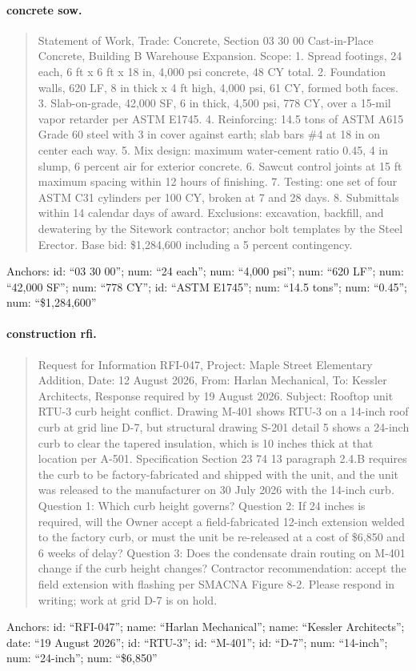 \paragraph{concrete sow.}
\begin{quote}\small Statement of Work, Trade: Concrete, Section 03 30 00 Cast-in-Place Concrete, Building B Warehouse Expansion. Scope: 1. Spread footings, 24 each, 6 ft x 6 ft x 18 in, 4,000 psi concrete, 48 CY total. 2. Foundation walls, 620 LF, 8 in thick x 4 ft high, 4,000 psi, 61 CY, formed both faces. 3. Slab-on-grade, 42,000 SF, 6 in thick, 4,500 psi, 778 CY, over a 15-mil vapor retarder per ASTM E1745. 4. Reinforcing: 14.5 tons of ASTM A615 Grade 60 steel with 3 in cover against earth; slab bars \#4 at 18 in on center each way. 5. Mix design: maximum water-cement ratio 0.45, 4 in slump, 6 percent air for exterior concrete. 6. Sawcut control joints at 15 ft maximum spacing within 12 hours of finishing. 7. Testing: one set of four ASTM C31 cylinders per 100 CY, broken at 7 and 28 days. 8. Submittals within 14 calendar days of award. Exclusions: excavation, backfill, and dewatering by the Sitework contractor; anchor bolt templates by the Steel Erector. Base bid: \$1,284,600 including a 5 percent contingency.\end{quote}
\noindent\footnotesize Anchors: id: ``03 30 00''; num: ``24 each''; num: ``4,000 psi''; num: ``620 LF''; num: ``42,000 SF''; num: ``778 CY''; id: ``ASTM E1745''; num: ``14.5 tons''; num: ``0.45''; num: ``\$1,284,600''\normalsize

\paragraph{construction rfi.}
\begin{quote}\small Request for Information RFI-047, Project: Maple Street Elementary Addition, Date: 12 August 2026, From: Harlan Mechanical, To: Kessler Architects, Response required by 19 August 2026. Subject: Rooftop unit RTU-3 curb height conflict. Drawing M-401 shows RTU-3 on a 14-inch roof curb at grid line D-7, but structural drawing S-201 detail 5 shows a 24-inch curb to clear the tapered insulation, which is 10 inches thick at that location per A-501. Specification Section 23 74 13 paragraph 2.4.B requires the curb to be factory-fabricated and shipped with the unit, and the unit was released to the manufacturer on 30 July 2026 with the 14-inch curb. Question 1: Which curb height governs? Question 2: If 24 inches is required, will the Owner accept a field-fabricated 12-inch extension welded to the factory curb, or must the unit be re-released at a cost of \$6,850 and 6 weeks of delay? Question 3: Does the condensate drain routing on M-401 change if the curb height changes? Contractor recommendation: accept the field extension with flashing per SMACNA Figure 8-2. Please respond in writing; work at grid D-7 is on hold.\end{quote}
\noindent\footnotesize Anchors: id: ``RFI-047''; name: ``Harlan Mechanical''; name: ``Kessler Architects''; date: ``19 August 2026''; id: ``RTU-3''; id: ``M-401''; id: ``D-7''; num: ``14-inch''; num: ``24-inch''; num: ``\$6,850''\normalsize


